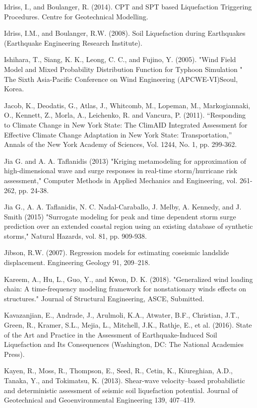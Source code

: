 Idriss, I., and Boulanger, R. (2014). CPT and SPT based Liquefaction Triggering Procedures. Centre for Geotechnical Modelling.

Idriss, I.M., and Boulanger, R.W. (2008). Soil Liquefaction during Earthquakes (Earthquake Engineering Research Institute).

Ishihara, T., Siang, K. K., Leong, C. C., and Fujino, Y. (2005). "Wind Field Model and Mixed Probability Distribution Function for Typhoon Simulation " The Sixth Asia-Pacific Conference on Wind Engineering (APCWE-VI)Seoul, Korea.

Jacob, K., Deodatis, G., Atlas, J., Whitcomb, M., Lopeman, M., Markogiannaki, O., Kennett, Z., Morla, A., Leichenko, R. and Vancura, P. (2011). “Responding to Climate Change in New York State: The ClimAID Integrated Assessment for Effective Climate Change Adaptation in New York State: Transportation,” Annals of the New York Academy of Sciences, Vol. 1244, No. 1, pp. 299-362.

Jia G. and A. A. Taflanidis (2013) "Kriging metamodeling for approximation of high-dimensional wave and surge responses in real-time storm/hurricane risk assessment," Computer Methods in Applied Mechanics and Engineering, vol. 261-262, pp. 24-38.

Jia G., A. A. Taflanidis, N. C. Nadal-Caraballo, J. Melby, A. Kennedy, and J. Smith (2015) "Surrogate modeling for peak and time dependent storm surge prediction over an extended coastal region using an existing database of synthetic storms," Natural Hazards, vol. 81, pp. 909-938.

Jibson, R.W. (2007). Regression models for estimating coseismic landslide displacement. Engineering Geology 91, 209–218.

Kareem, A., Hu, L., Guo, Y., and Kwon, D. K. (2018). "Generalized wind loading chain: A time-frequency modeling framework for nonstationary winds effects on structures." Journal of Structural Engineering, ASCE, Submitted.

Kavazanjian, E., Andrade, J., Arulmoli, K.A., Atwater, B.F., Christian, J.T., Green, R., Kramer, S.L., Mejia, L., Mitchell, J.K., Rathje, E., et al. (2016). State of the Art and Practice in the Assessment of Earthquake-Induced Soil Liquefaction and Its Consequences (Washington, DC: The National Academies Press).

Kayen, R., Moss, R., Thompson, E., Seed, R., Cetin, K., Kiureghian, A.D., Tanaka, Y., and Tokimatsu, K. (2013). Shear-wave velocity–based probabilistic and deterministic assessment of seismic soil liquefaction potential. Journal of Geotechnical and Geoenvironmental Engineering 139, 407–419.


